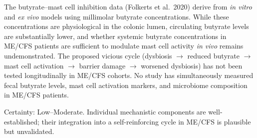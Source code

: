 \begin{warning}
The butyrate--mast cell inhibition data (Folkerts et al.\ 2020) derive from \textit{in vitro} and \textit{ex vivo} models using millimolar butyrate concentrations. While these concentrations are physiological in the colonic lumen, circulating butyrate levels are substantially lower, and whether systemic butyrate concentrations in ME/CFS patients are sufficient to modulate mast cell activity \textit{in vivo} remains undemonstrated. The proposed vicious cycle (dysbiosis $\to$ reduced butyrate $\to$ mast cell activation $\to$ barrier damage $\to$ worsened dysbiosis) has not been tested longitudinally in ME/CFS cohorts. No study has simultaneously measured fecal butyrate levels, mast cell activation markers, and microbiome composition in ME/CFS patients.

Certainty: Low--Moderate. Individual mechanistic components are well-established; their integration into a self-reinforcing cycle in ME/CFS is plausible but unvalidated.
\end{warning}

